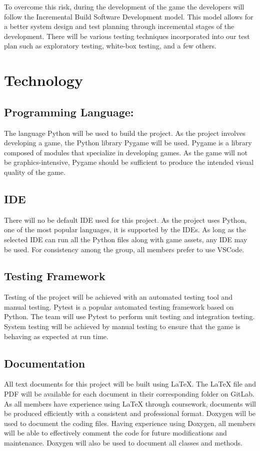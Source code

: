\documentclass{article}
\begin{document}
To overcome this risk, during the development of the game the developers will follow the Incremental Build Software Development model. This model allows for a better system design and test planning through incremental stages of the development. There will be various testing techniques incorporated into our test plan such as exploratory testing, white-box testing, and a few others.

\section{Technology}
\subsection{Programming Language: }
The language Python will be used to build the project. As the project involves developing a game, the Python library Pygame will be used. Pygame is a library composed of modules that specialize in developing games. As the game will not be graphics-intensive, Pygame should be sufficient to produce the intended visual quality of the game.  

\subsection{IDE}
There will no be default IDE used for this project. As the project uses Python, one of the most popular languages, it is supported by the IDEs. As long as the selected IDE can run all the Python files along with game assets, any IDE may be used. For consistency among the group, all members prefer to use VSCode.

\subsection{Testing Framework}
Testing of the project will be achieved with an automated testing tool and manual testing. Pytest is a popular automated testing framework based on Python. The team will use Pytest to perform unit testing and integration testing. System testing will be achieved by manual testing to ensure that the game is behaving as expected at run time. 

\subsection{Documentation}
All text documents for this project will be built using LaTeX. The LaTeX file and PDF will be available for each document in their corresponding folder on GitLab. As all members have experience using LaTeX through coursework, documents will be produced efficiently with a consistent and professional format. Doxygen will be used to document the coding files. Having experience using Doxygen, all members will be able to effectively comment the code for future modifications and maintenance. Doxygen will also be used to document all classes and methods. 
\end{document}
